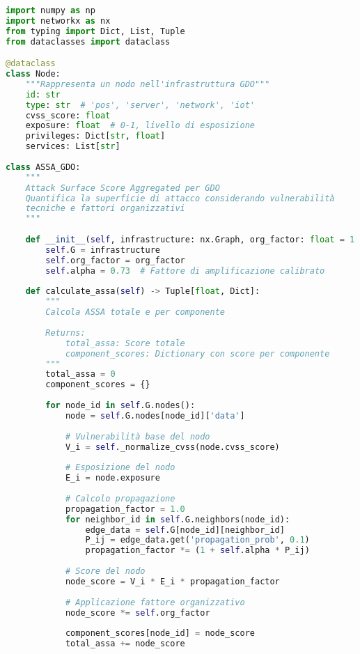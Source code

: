 \begin{lstlisting}[language=Python, caption=Implementazione dell'algoritmo ASSA-GDO]
import numpy as np
import networkx as nx
from typing import Dict, List, Tuple
from dataclasses import dataclass

@dataclass
class Node:
    """Rappresenta un nodo nell'infrastruttura GDO"""
    id: str
    type: str  # 'pos', 'server', 'network', 'iot'
    cvss_score: float
    exposure: float  # 0-1, livello di esposizione
    privileges: Dict[str, float]
    services: List[str]
    
class ASSA_GDO:
    """
    Attack Surface Score Aggregated per GDO
    Quantifica la superficie di attacco considerando vulnerabilità
    tecniche e fattori organizzativi
    """
    
    def __init__(self, infrastructure: nx.Graph, org_factor: float = 1.0):
        self.G = infrastructure
        self.org_factor = org_factor
        self.alpha = 0.73  # Fattore di amplificazione calibrato
        
    def calculate_assa(self) -> Tuple[float, Dict]:
        """
        Calcola ASSA totale e per componente
        
        Returns:
            total_assa: Score totale
            component_scores: Dictionary con score per componente
        """
        total_assa = 0
        component_scores = {}
        
        for node_id in self.G.nodes():
            node = self.G.nodes[node_id]['data']
            
            # Vulnerabilità base del nodo
            V_i = self._normalize_cvss(node.cvss_score)
            
            # Esposizione del nodo
            E_i = node.exposure
            
            # Calcolo propagazione
            propagation_factor = 1.0
            for neighbor_id in self.G.neighbors(node_id):
                edge_data = self.G[node_id][neighbor_id]
                P_ij = edge_data.get('propagation_prob', 0.1)
                propagation_factor *= (1 + self.alpha * P_ij)
            
            # Score del nodo
            node_score = V_i * E_i * propagation_factor
            
            # Applicazione fattore organizzativo
            node_score *= self.org_factor
            
            component_scores[node_id] = node_score
            total_assa += node_score
            

\end{lstlisting}
